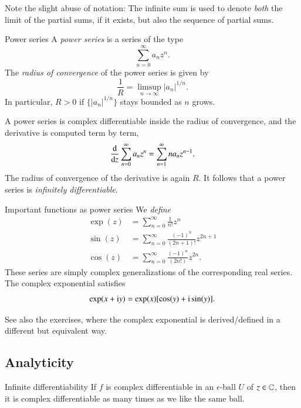 Note the slight abuse of notation: The infinite sum is used to denote \emph{both} the limit of the partial sums, if it exists, but also the sequence of partial sums.

\begin{myTheorem}{Power series}{}
A \emph{power series} is a series of the type
\begin{equation}
    \sum_{n=0}^\infty a_n z^n.
\end{equation}
The \emph{radius of convergence} of the power series is given by
\begin{equation}
    \frac{1}{R} = \limsup_{n\to\infty} |a_n|^{1/n}.
\end{equation}
In particular, $R > 0$ if $\{|a_n|^{1/n}\}$ stays bounded as $n$ grows.

A power series is complex differentiable inside the radius of convergence, and the derivative is computed term by term,
\begin{equation}
    \frac{\mathrm{d} }{\mathrm{d} z} \sum_{n=0}^\infty a_n z^n = \sum_{n=1}^\infty n a_n z^{n-1}.
\end{equation}
The radius of convergence of the derivative is again $R$. It follows that a power series is \emph{infinitely differentiable}.
\end{myTheorem}

\begin{myDefinition}{Important functions as power series}{}
We \emph{define}
\begin{align}
    \exp(z) &= \sum_{n=0}^\infty \frac{1}{n!} z^n \\
    \sin(z) &= \sum_{n=0}^\infty \frac{(-1)^n}{(2n+1)!} z^{2n+1} \\
    \cos(z) &= \sum_{n=0}^\infty \frac{(-1)^n}{(2n!)} z^{2n}.
\end{align}
These series are simply complex generalizations of the corresponding real series. The complex exponential satisfies
\begin{equation}
    \exp(x + \mathrm{i} y) = \exp(x)[\cos(y) + \mathrm{i}\sin(y)].
\end{equation}
\end{myDefinition}
See also the exercises, where the complex exponential is derived/defined in a different but equivalent way.


\subsection{Analyticity}

\begin{myTheorem}{Infinite differentiability}{}
    If $f$ is complex differentiable in an $\epsilon$-ball $U$ of $z\in \mathbb{C}$, then it is complex differentiable as many times as we like the same ball. 
\end{myTheorem}


